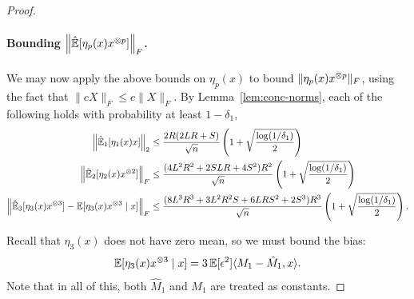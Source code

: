 \documentclass[tablecaption=bottom]{jmlr}
\newcommand\reflem[1]{Lemma~\ref{lem:#1}}
\begin{document}
\begin{proof}
\paragraph{Bounding $\left\| \hat{\operatorname{\mathbb{E}}}[\eta_p(x)x^{\otimes p}] \right\|_F$.}
We may now apply the above bounds on $\eta_p(x)$ to bound $\|\eta_p(x) x^{\otimes p}\|_F$, using the fact that $\|c X\|_F \le c\|X\|_F$.
By \reflem{conc-norms}, each of the following holds with probability at least $1-\delta_1$,
\begin{align*}
    \left\|\hat{\operatorname{\mathbb{E}}}_1[\eta_1(x) x] \right\|_2
      &\le \frac{2R (2LR + S)}{\sqrt{n}} \left( 1 + \sqrt{\frac{\log(1/\delta_1)}{2}} \right) \\
  \left\|\hat{\operatorname{\mathbb{E}}}_2[\eta_2(x) x^{\otimes 2}] \right\|_F
      &\le \frac{(4L^2 R^2 + 2 S L R + 4S^2)R^2}{\sqrt{n}} \left( 1 + \sqrt{\frac{\log(1/\delta_1)}{2}} \right) \\
  \left\|\hat{\operatorname{\mathbb{E}}}_3[\eta_3(x) x^{\otimes 3}] - \operatorname{\mathbb{E}}[\eta_3(x) x^{\otimes 3} \mid x] \right\|_F
      &\le \frac{(8L^3 R^3 + 3 L^2 R^2 S + 6 L R S^2 + 2S^3) R^3}{\sqrt{n}} \left( 1 + \sqrt{\frac{\log(1/\delta_1)}{2}} \right).
\end{align*}

Recall that $\eta_3(x)$ does not have zero mean, so we must bound the bias:
\begin{align*}
  \operatorname{\mathbb{E}}[\eta_3(x) x^{\otimes 3} \mid x] = 3 \operatorname{\mathbb{E}}[\epsilon^2] \langle M_1 - \hat M_1, x \rangle.
\end{align*}
Note that in all of this, both $\hat M_1$ and $M_1$ are treated as constants.


\end{proof}
\end{document}
